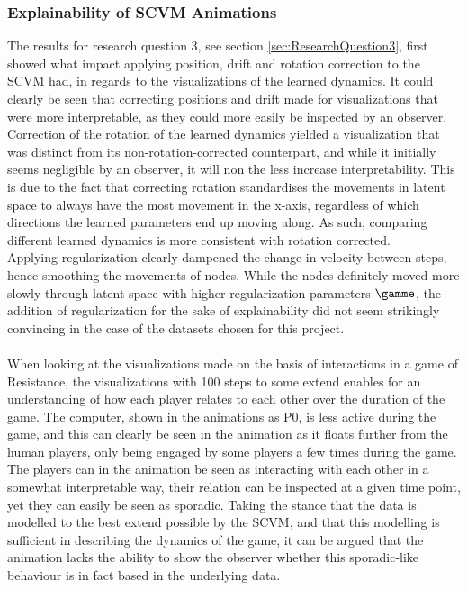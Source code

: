 \subsubsection{Explainability of SCVM Animations}
\label{sec:Discussion:Results:Explainability}
The results for research question 3, see section \ref{sec:ResearchQuestion3}, first showed what impact applying position, drift and rotation correction to the SCVM had, in regards to the visualizations of the learned dynamics.
It could clearly be seen that correcting positions and drift made for visualizations that were more interpretable, as they could more easily be inspected by an observer.
\\
Correction of the rotation of the learned dynamics yielded a visualization that was distinct from its non-rotation-corrected counterpart, and while it initially seems negligible by an observer, it will non the less increase interpretability.
This is due to the fact that correcting rotation standardises the movements in latent space to always have the most movement in the x-axis, regardless of which directions the learned parameters end up moving along.
As such, comparing different learned dynamics is more consistent with rotation corrected.
\\
Applying regularization clearly dampened the change in velocity between steps, hence smoothing the movements of nodes. 
While the nodes definitely moved more slowly through latent space with higher regularization parameters $\gamme$, the addition of regularization for the sake of explainability did not seem strikingly convincing in the case of the datasets chosen for this project.
\\\\
When looking at the visualizations made on the basis of interactions in a game of Resistance, the visualizations with 100 steps to some extend enables for an understanding of how each player relates to each other over the duration of the game. 
The computer, shown in the animations as P0, is less active during the game, and this can clearly be seen in the animation as it floats further from the human players, only being engaged by some players a few times during the game.
The players can in the animation be seen as interacting with each other in a somewhat interpretable way, their relation can be inspected at a given time point, yet they can easily be seen as sporadic.
Taking the stance that the data is modelled to the best extend possible by the SCVM, and that this modelling is sufficient in describing the dynamics of the game, it can be argued that the animation lacks the ability to show the observer whether this sporadic-like behaviour is in fact based in the underlying data.

